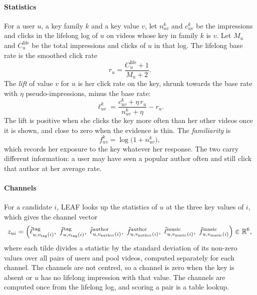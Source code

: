 \paragraph{Statistics} For a user $u$, a key family $k$ and a key value $v$, let $n^k_{uv}$ and $c^k_{uv}$ be the impressions and clicks
in the lifelong log of $u$ on videos whose key in family $k$ is $v$. Let $M_u$ and $C_u^{\mathrm{life}}$ be the total impressions and
clicks of $u$ in that log. The lifelong base rate is the smoothed click rate
\begin{equation}
  r_u=\frac{C_u^{\mathrm{life}}+1}{M_u+2}.
  \label{eq:base-rate}
\end{equation}
The \emph{lift} of value $v$ for $u$ is her click rate on the key, shrunk towards the base rate with $\eta$ pseudo-impressions, minus
the base rate:
\begin{equation}
  \ell^k_{uv}=\frac{c^k_{uv}+\eta\,r_u}{n^k_{uv}+\eta}-r_u .
  \label{eq:lift}
\end{equation}
The lift is positive when she clicks the key more often than her other videos once it is shown, and close to zero when the evidence is
thin. The \emph{familiarity} is
\begin{equation}
  f^k_{uv}=\log\bigl(1+n^k_{uv}\bigr),
  \label{eq:familiarity}
\end{equation}
which records her exposure to the key whatever her response. The two carry different information: a user may have seen a popular author
often and still click that author at her average rate.

\paragraph{Channels} For a candidate $i$, LEAF looks up the statistics of $u$ at the three key values of $i$, which gives the channel vector
\begin{equation}
  z_{ui}=\Bigl(\tilde\ell^{\mathrm{tag}}_{u,v_{\mathrm{tag}}(i)},\ \tilde f^{\mathrm{tag}}_{u,v_{\mathrm{tag}}(i)},\
  \tilde\ell^{\mathrm{author}}_{u,v_{\mathrm{author}}(i)},\ \tilde f^{\mathrm{author}}_{u,v_{\mathrm{author}}(i)},\
  \tilde\ell^{\mathrm{music}}_{u,v_{\mathrm{music}}(i)},\ \tilde f^{\mathrm{music}}_{u,v_{\mathrm{music}}(i)}\Bigr)\in\mathbb R^6,
  \label{eq:channels}
\end{equation}
where each tilde divides a statistic by the standard deviation of its non-zero values over all pairs of users and pool videos, computed
separately for each channel. The channels are not centred, so a channel is zero when the key is absent or $u$ has no lifelong impression
with that value. The channels are computed once from the lifelong log, and scoring a pair is a table lookup.

